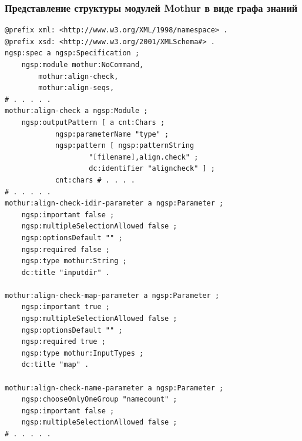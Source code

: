 \documentclass[10pt]{beamer}
\begin{document}
\begin{frame}[fragile]
  \frametitle{Представление структуры модулей Mothur в виде графа знаний}
\begin{multicols}{2}
\begin{verbatim}
@prefix xml: <http://www.w3.org/XML/1998/namespace> .
@prefix xsd: <http://www.w3.org/2001/XMLSchema#> .
ngsp:spec a ngsp:Specification ;
    ngsp:module mothur:NoCommand,
        mothur:align-check,
        mothur:align-seqs,
# . . . . .
mothur:align-check a ngsp:Module ;
    ngsp:outputPattern [ a cnt:Chars ;
            ngsp:parameterName "type" ;
            ngsp:pattern [ ngsp:patternString
                    "[filename],align.check" ;
                    dc:identifier "aligncheck" ] ;
            cnt:chars # . . . .
# . . . . .
mothur:align-check-idir-parameter a ngsp:Parameter ;
    ngsp:important false ;
    ngsp:multipleSelectionAllowed false ;
    ngsp:optionsDefault "" ;
    ngsp:required false ;
    ngsp:type mothur:String ;
    dc:title "inputdir" .

mothur:align-check-map-parameter a ngsp:Parameter ;
    ngsp:important true ;
    ngsp:multipleSelectionAllowed false ;
    ngsp:optionsDefault "" ;
    ngsp:required true ;
    ngsp:type mothur:InputTypes ;
    dc:title "map" .

mothur:align-check-name-parameter a ngsp:Parameter ;
    ngsp:chooseOnlyOneGroup "namecount" ;
    ngsp:important false ;
    ngsp:multipleSelectionAllowed false ;
# . . . . .
\end{verbatim}


\end{multicols}
\end{frame}
\end{document}
